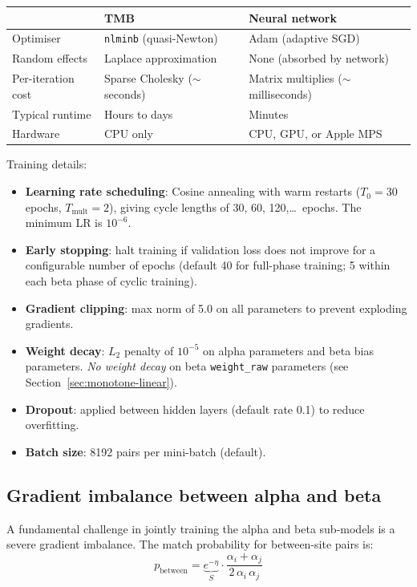 \documentclass{article}
\begin{document}
\begin{center}
\begin{tabular}{l|l|l}
    & TMB & Neural network \\
    \hline
    Optimiser & \texttt{nlminb} (quasi-Newton) & Adam (adaptive SGD) \\
    Random effects & Laplace approximation & None (absorbed by network) \\
    Per-iteration cost & Sparse Cholesky ($\sim$ seconds) & Matrix multiplies ($\sim$ milliseconds) \\
    Typical runtime & Hours to days & Minutes \\
    Hardware & CPU only & CPU, GPU, or Apple MPS \\
\end{tabular}
\end{center}

Training details:
\begin{itemize}
    \item \textbf{Learning rate scheduling}: Cosine annealing with warm restarts ($T_0 = 30$ epochs, $T_{\text{mult}} = 2$), giving cycle lengths of 30, 60, 120,\ldots\ epochs. The minimum LR is $10^{-6}$.
    \item \textbf{Early stopping}: halt training if validation loss does not improve for a configurable number of epochs (default 40 for full-phase training; 5 within each beta phase of cyclic training).
    \item \textbf{Gradient clipping}: max norm of 5.0 on all parameters to prevent exploding gradients.
    \item \textbf{Weight decay}: $L_2$ penalty of $10^{-5}$ on alpha parameters and beta bias parameters. \textit{No weight decay} on beta \texttt{weight\_raw} parameters (see Section~\ref{sec:monotone-linear}).
    \item \textbf{Dropout}: applied between hidden layers (default rate 0.1) to reduce overfitting.
    \item \textbf{Batch size}: 8192 pairs per mini-batch (default).
\end{itemize}

\subsection{Gradient imbalance between alpha and beta}
\label{sec:grad-imbalance}

A fundamental challenge in jointly training the alpha and beta sub-models is a severe gradient imbalance. The match probability for between-site pairs is:
\begin{equation*}
    p_{\text{between}} = \underbrace{e^{-\eta}}_{S} \cdot \frac{\alpha_i + \alpha_j}{2\,\alpha_i\,\alpha_j}
\end{equation*}
\end{document}
